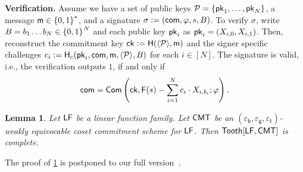 \documentclass[version=final]{iacrcc}
\theoremstyle{mytheorem}				\newtheorem{theorem}{Theorem}
\theoremstyle{myplain}
\newtheorem{lemma}{Lemma}
\theoremstyle{mydefinition}
\theoremstyle{myremark}
\begin{document}
\smallskip\noindent\textbf{Verification.} Assume we have a set of public keys ${\mathcal{P}} = \{{\mathsf{pk}}_1,\dots,{\mathsf{pk}}_N\}$, a message $\mathsf{m} \in {\ensuremath{{\{0,1\}}^{*}}}$, and a signature $\sigma:=(\mathsf{com},\varphi,s,B)$.
To verify $\sigma$, write $B = b_1\dots b_N \in {\ensuremath{{\{0,1\}}^{\relax}}}^N$ and each public key ${\mathsf{pk}}_i$ as ${\mathsf{pk}}_i = (X_{i,0},X_{i,1})$.
Then, reconstruct the commitment key ${\mathsf{ck}} := \mathsf{H}({\langle{{\ensuremath{\mathcal{P}}}}\rangle},\mathsf{m})$ and the signer specific challenges $c_{i} := \mathsf{H}_c({\mathsf{pk}}_i,\mathsf{com},\mathsf{m},{\langle{{\ensuremath{\mathcal{P}}}}\rangle},B)$ for each $i \in [N]$.
The signature is valid, i.e., the verification outputs $1$, if and only if
\begin{align*}
	\mathsf{com} = {\mathsf{Com}}\left({\mathsf{ck}},{\mathsf{F}}(s)-\sum_{i=1}^N c_{i}\cdot X_{i,b_i};\varphi\right).
\end{align*}
\begin{lemma}
	Let ${\mathsf{LF}}$ be a linear function family. 
	Let $\mathsf{CMT}$ be an $(\varepsilon_{\mathsf{b}},\varepsilon_{\mathsf{g}},\varepsilon_{\mathsf{t}})$-weakly equivocable coset commitment scheme for ${\mathsf{LF}}$.
	Then ${\mathsf{Tooth}[{{\mathsf{LF}}},{\mathsf{CMT}}]}$ is complete.
	\label{lemma:toothpicks:tight:completeness}
\end{lemma}
\ifnum{}
The proof of \cref{lemma:toothpicks:tight:completeness} is postponed to our full version~\cite{fullversion}.
\else
\ifnum{}
\end{document}
